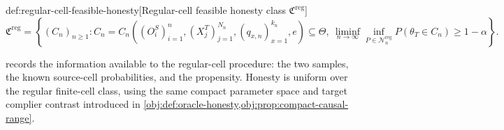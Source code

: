 \begin{definitionv}{def:regular-cell-feasible-honesty}[Regular-cell feasible honesty class \(\mathfrak C^{\mathrm{reg}}\)]
\[
\mathfrak C^{\mathrm{reg}}
=
\left\{
(C_n)_{n\ge 1}:
C_n
=
C_n\left(
(O_i^S)_{i=1}^n,
(X_j^T)_{j=1}^{N_n},
(q_{x,n})_{x=1}^{k_n},e
\right)
\subseteq \Theta,\ 
\liminf_{n\to\infty}\inf_{P\in\mathcal N_n^{\mathrm{reg}}}
P(\theta_T\in C_n)\ge 1-\alpha
\right\}.
\]
\end{definitionv}

 records the information available to the regular-cell procedure: the two samples, the known source-cell probabilities, and the propensity. Honesty is uniform over the regular finite-cell class, using the same compact parameter space and target complier contrast introduced in \cref{obj:def:oracle-honesty,obj:prop:compact-causal-range}.

